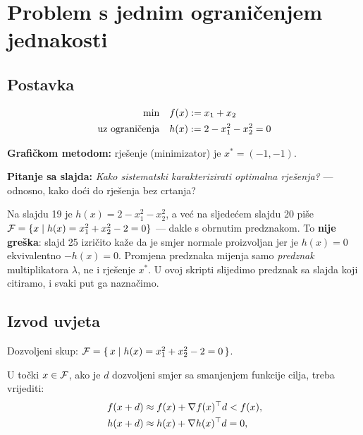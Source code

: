 \section{Problem s jednim ograničenjem jednakosti}
\label{sec:jedna-jednakost}

\subsection{Postavka}

\begin{equation}
\begin{aligned}
\min \quad & f(x) := x_1 + x_2 \\
\uzogr & h(x) := 2 - x_1^2 - x_2^2 = 0
\end{aligned}
\end{equation}

\textbf{Grafičkom metodom:} rješenje (minimizator) je $x^{*} = (-1, -1)$.

\textbf{Pitanje sa slajda:} \emph{Kako sistematski karakterizirati optimalna
rješenja?} --- odnosno, kako doći do rješenja bez crtanja?

\begin{napomena}
Na slajdu 19 je $h(x) = 2 - x_1^2 - x_2^2$, a već na sljedećem slajdu 20 piše
$\Feas = \{x \mid h(x) = x_1^2 + x_2^2 - 2 = 0\}$ --- dakle s obrnutim
predznakom. To \textbf{nije greška}: slajd 25 izričito kaže da je smjer normale
proizvoljan jer je $h(x) = 0$ ekvivalentno $-h(x) = 0$. Promjena predznaka mijenja
samo \emph{predznak} multiplikatora $\lambda$, ne i rješenje $x^{*}$. U ovoj
skripti slijedimo predznak sa slajda koji citiramo, i svaki put ga naznačimo.
\end{napomena}

\subsection{Izvod uvjeta}

Dozvoljeni skup: $\Feas = \{\, x \mid h(x) = x_1^2 + x_2^2 - 2 = 0 \,\}$.

U točki $x \in \Feas$, ako je $d$ dozvoljeni smjer sa smanjenjem funkcije cilja,
treba vrijediti:
\begin{align}
f(x + d) &\approx f(x) + \nabla f(x)\T d < f(x), \\
h(x + d) &\approx h(x) + \nabla h(x)\T d = 0,
\end{align}

